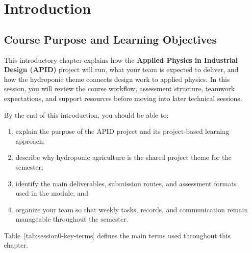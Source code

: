 \chapter{Introduction}

\section{Course Purpose and Learning Objectives}

This introductory chapter explains how the \textbf{Applied Physics in Industrial Design (APID)} project will run, what your team is expected to deliver, and how the hydroponic theme connects design work to applied physics. In this session, you will review the course workflow, assessment structure, teamwork expectations, and support resources before moving into later technical sessions.

By the end of this introduction, you should be able to:
\begin{enumerate}
    \item explain the purpose of the APID project and its project-based learning approach;
    \item describe why hydroponic agriculture is the shared project theme for the semester;
    \item identify the main deliverables, submission routes, and assessment formats used in the module; and
    \item organize your team so that weekly tasks, records, and communication remain manageable throughout the semester.
\end{enumerate}

Table~\ref{tab:session0-key-terms} defines the main terms used throughout this chapter.

